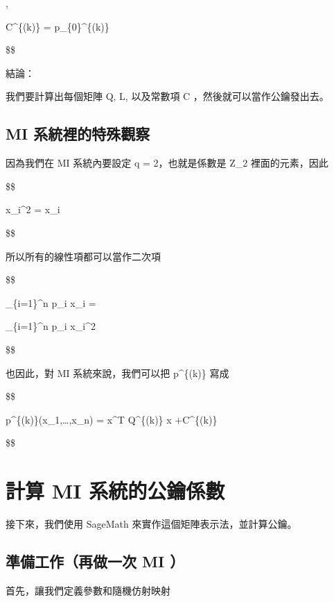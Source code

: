 \documentclass[
]{article}
\begin{document}
,

\quad C\^{}\{(k)\} = p\_\{0\}\^{}\{(k)\}

\$\$

結論：

我們要計算出每個矩陣 Q, L, 以及常數項 C ，然後就可以當作公鑰發出去。

\hypertarget{mi-ux7cfbux7d71ux88e1ux7684ux7279ux6b8aux89c0ux5bdf}{%
\subsection{MI
系統裡的特殊觀察}\label{mi-ux7cfbux7d71ux88e1ux7684ux7279ux6b8aux89c0ux5bdf}}

因為我們在 MI 系統內要設定 q = 2，也就是係數是 Z\_2 裡面的元素，因此

\$\$

x\_i\^{}2 = x\_i

\$\$

所以所有的線性項都可以當作二次項

\$\$

\sum\_\{i=1\}\^{}n p\_i x\_i =

\sum\_\{i=1\}\^{}n p\_i x\_i\^{}2

\$\$

也因此，對 MI 系統來說，我們可以把 p\^{}\{(k)\} 寫成

\$\$

p\^{}\{(k)\}(x\_1,\ldots,x\_n) = x\^{}T Q\^{}\{(k)\} x +C\^{}\{(k)\}

\$\$

\hypertarget{ux8a08ux7b97-mi-ux7cfbux7d71ux7684ux516cux9470ux4fc2ux6578}{%
\section{計算 MI
系統的公鑰係數}\label{ux8a08ux7b97-mi-ux7cfbux7d71ux7684ux516cux9470ux4fc2ux6578}}

接下來，我們使用 SageMath 來實作這個矩陣表示法，並計算公鑰。

\hypertarget{ux6e96ux5099ux5de5ux4f5cux518dux505aux4e00ux6b21-mi}{%
\subsection{準備工作（再做一次 MI
）}\label{ux6e96ux5099ux5de5ux4f5cux518dux505aux4e00ux6b21-mi}}

首先，讓我們定義參數和隨機仿射映射
\end{document}
